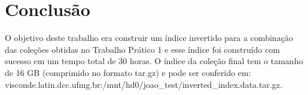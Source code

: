 \documentclass{report}
\begin{document}
\chapter{Conclusão}

O objetivo deste trabalho era construir um índice invertido para a combinação das coleções obtidas no
Trabalho Prático 1 e esse índice foi construído com sucesso em um tempo total de 30 horas. O índice da coleção final
tem o tamanho de 16 GB (comprimido no formato tar.gz) e pode ser conferido em: \newline
visconde.latin.dcc.ufmg.br:/mnt/hd0/joao\_test/inverted\_index.data.tar.gz.
\end{document}
